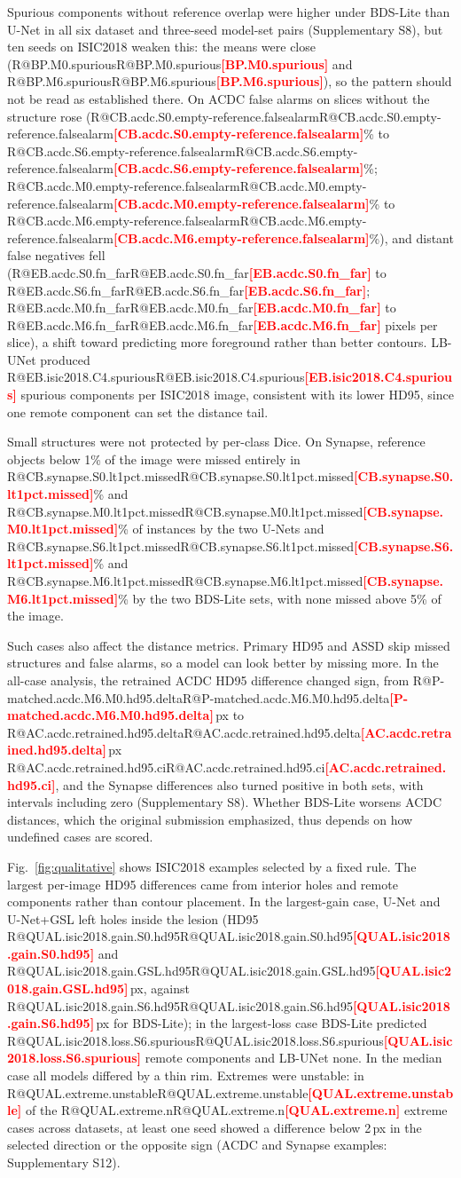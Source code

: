 \documentclass[fleqn,10pt,lineno]{wlpeerj}
\makeatletter
\newcommand{\R}[1]{\ifcsname R@#1\endcsname\csname R@#1\endcsname\else\textbf{\textcolor{red}{[#1]}}\fi}
\makeatother
\begin{document}
Spurious components without reference overlap were higher under BDS-Lite than U-Net in all six dataset and three-seed model-set pairs (Supplementary S8), but ten seeds on ISIC2018 weaken this: the means were close (\R{BP.M0.spurious} and \R{BP.M6.spurious}), so the pattern should not be read as established there. On ACDC false alarms on slices without the structure rose (\R{CB.acdc.S0.empty-reference.falsealarm}\% to \R{CB.acdc.S6.empty-reference.falsealarm}\%; \R{CB.acdc.M0.empty-reference.falsealarm}\% to \R{CB.acdc.M6.empty-reference.falsealarm}\%), and distant false negatives fell (\R{EB.acdc.S0.fn_far} to \R{EB.acdc.S6.fn_far}; \R{EB.acdc.M0.fn_far} to \R{EB.acdc.M6.fn_far} pixels per slice), a shift toward predicting more foreground rather than better contours. LB-UNet produced \R{EB.isic2018.C4.spurious} spurious components per ISIC2018 image, consistent with its lower HD95, since one remote component can set the distance tail.

Small structures were not protected by per-class Dice. On Synapse, reference objects below 1\% of the image were missed entirely in \R{CB.synapse.S0.lt1pct.missed}\% and \R{CB.synapse.M0.lt1pct.missed}\% of instances by the two U-Nets and \R{CB.synapse.S6.lt1pct.missed}\% and \R{CB.synapse.M6.lt1pct.missed}\% by the two BDS-Lite sets, with none missed above 5\% of the image.

Such cases also affect the distance metrics. Primary HD95 and ASSD skip missed structures and false alarms, so a model can look better by missing more. In the all-case analysis, the retrained ACDC HD95 difference changed sign, from \R{P-matched.acdc.M6.M0.hd95.delta}\,px to \R{AC.acdc.retrained.hd95.delta}\,px \R{AC.acdc.retrained.hd95.ci}, and the Synapse differences also turned positive in both sets, with intervals including zero (Supplementary S8). Whether BDS-Lite worsens ACDC distances, which the original submission emphasized, thus depends on how undefined cases are scored.

Fig.~\ref{fig:qualitative} shows ISIC2018 examples selected by a fixed rule. The largest per-image HD95 differences came from interior holes and remote components rather than contour placement. In the largest-gain case, U-Net and U-Net+GSL left holes inside the lesion (HD95 \R{QUAL.isic2018.gain.S0.hd95} and \R{QUAL.isic2018.gain.GSL.hd95}\,px, against \R{QUAL.isic2018.gain.S6.hd95}\,px for BDS-Lite); in the largest-loss case BDS-Lite predicted \R{QUAL.isic2018.loss.S6.spurious} remote components and LB-UNet none. In the median case all models differed by a thin rim. Extremes were unstable: in \R{QUAL.extreme.unstable} of the \R{QUAL.extreme.n} extreme cases across datasets, at least one seed showed a difference below 2\,px in the selected direction or the opposite sign (ACDC and Synapse examples: Supplementary S12).
\end{document}
